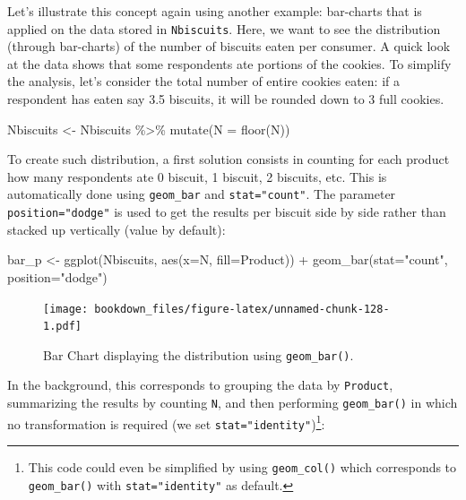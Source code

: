 \documentclass[
]{krantz}
\makeatletter
\newenvironment{Shaded}{\begin{snugshade}}{\end{snugshade}}
\newcommand{\AttributeTok}[1]{\textcolor[rgb]{0.61,0.61,0.61}{#1}}
\newcommand{\FunctionTok}[1]{\textcolor[rgb]{0,0,0}{#1}}
\newcommand{\NormalTok}[1]{#1}
\newcommand{\OtherTok}[1]{\textcolor[rgb]{0.37,0.37,0.37}{#1}}
\newcommand{\SpecialCharTok}[1]{\textcolor[rgb]{0,0,0}{#1}}
\newcommand{\StringTok}[1]{\textcolor[rgb]{0.5,0.5,0.5}{#1}}
\newenvironment{kframe}{%
\medskip{}
\setlength{\fboxsep}{.8em}
 \def\at@end@of@kframe{}%
 \ifinner\ifhmode%
  \def\at@end@of@kframe{\end{minipage}}%
  \begin{minipage}{\columnwidth}%
 \fi\fi%
 \def\FrameCommand##1{\hskip\@totalleftmargin \hskip-\fboxsep
 \colorbox{shadecolor}{##1}\hskip-\fboxsep
     \hskip-\linewidth \hskip-\@totalleftmargin \hskip\columnwidth}%
 \MakeFramed {\advance\hsize-\width
   \@totalleftmargin\z@ \linewidth\hsize
   \@setminipage}}%
 {\par\unskip\endMakeFramed%
 \at@end@of@kframe}
\renewenvironment{Shaded}{\begin{kframe}}{\end{kframe}}
\makeatother
\begin{document}
Let's illustrate this concept again using another example: bar-charts that is applied on the data stored in \texttt{Nbiscuits}.
Here, we want to see the distribution (through bar-charts) of the number of biscuits eaten per consumer. A quick look at the data shows that some respondents ate portions of the cookies. To simplify the analysis, let's consider the total number of entire cookies eaten: if a respondent has eaten say 3.5 biscuits, it will be rounded down to 3 full cookies.

\begin{Shaded}
\begin{Highlighting}[]
\NormalTok{Nbiscuits }\OtherTok{\textless{}{-}}\NormalTok{ Nbiscuits }\SpecialCharTok{\%\textgreater{}\%} 
  \FunctionTok{mutate}\NormalTok{(}\AttributeTok{N =} \FunctionTok{floor}\NormalTok{(N))}
\end{Highlighting}
\end{Shaded}

To create such distribution, a first solution consists in counting for each product how many respondents ate 0 biscuit, 1 biscuit, 2 biscuits, etc. This is automatically done using \texttt{geom\_bar} and \texttt{stat="count"}. The parameter \texttt{position="dodge"} is used to get the results per biscuit side by side rather than stacked up vertically (value by default):

\begin{Shaded}
\begin{Highlighting}[]
\NormalTok{bar\_p }\OtherTok{\textless{}{-}} \FunctionTok{ggplot}\NormalTok{(Nbiscuits, }\FunctionTok{aes}\NormalTok{(}\AttributeTok{x=}\NormalTok{N, }\AttributeTok{fill=}\NormalTok{Product)) }\SpecialCharTok{+}
  \FunctionTok{geom\_bar}\NormalTok{(}\AttributeTok{stat=}\StringTok{"count"}\NormalTok{, }\AttributeTok{position=}\StringTok{"dodge"}\NormalTok{)}
\end{Highlighting}
\end{Shaded}

\begin{figure}
\centering
\texttt{[image: bookdown\_files/figure-latex/unnamed-chunk-128-1.pdf]}
\caption{\label{fig:unnamed-chunk-128}Bar Chart displaying the distribution using \texttt{geom\_bar()}.}
\end{figure}

In the background, this corresponds to grouping the data by \texttt{Product}, summarizing the results by counting \texttt{N}, and then performing \texttt{geom\_bar()} in which no transformation is required (we set \texttt{stat="identity"})\footnote{This code could even be simplified by using \texttt{geom\_col()} which corresponds to \texttt{geom\_bar()} with \texttt{stat="identity"} as default.}:
\end{document}
